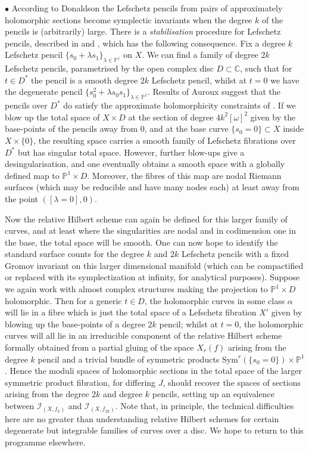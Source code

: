 \documentclass[10pt]{article}
\newcommand{\pp}{\mathbb{P}}
\newcommand{\cc}{\mathbb{C}}
\newcommand{\Sym}{\mathrm{Sym}}
\begin{document}
\noindent $\bullet$  According to Donaldson \cite{Donaldson:pencils} the
Lefschetz pencils from pairs of  approximately holomorphic sections
become symplectic invariants when the degree $k$ of the pencils is
(arbitrarily) large.  There is a
\emph{stabilisation} procedure for Lefschetz pencils, described in
\cite{ivanmodulidivisor} and \cite{AKstabilisation}, which has the
following consequence.  Fix a degree $k$ Lefschetz pencil $\{ s_0 +
\lambda s_1 \}_{\lambda \in \pp^1}$ on $X$.  We can find a family of
degree $2k$ Lefschetz pencils, parametrised by the open complex disc
$D \subset \cc$, such that for $t \in D^*$ the pencil is a smooth
degree $2k$ Lefschetz pencil, whilst at $t = 0$ we have the degenerate
pencil $\{ s_0^2 + \lambda s_0 s_1 \}_{\lambda \in \pp^1}$.  Results 
of Auroux \cite{AurouxGokova} suggest that 
the pencils over $D^*$ do satisfy the
approximate holomorphicity constraints of \cite{Donaldson:pencils}. If we 
blow up the total space of $X \times D$ at the section of degree $4k^2
[\omega]^2$ given by the base-points of the pencils away from $0$, and
at the base curve $\{ s_0 = 0 \} \subset X$ inside $X \times \{ 0 \}$,
the resulting space carries a smooth family of Lefschetz fibrations over
$D^*$ but has singular total space.  However, further blow-ups give a
desingularisation, and one eventually obtains a smooth space with
a globally defined map to $\pp^1 \times D$.
Moreover, the fibres of this map are nodal Riemann surfaces (which may
be reducible and have many nodes each) at least away from the point
$([\lambda=0],0)$.

\vspace{0.2cm}

\noindent Now the relative Hilbert scheme can again be defined for
this larger family of curves, and at least where the singularities are
nodal and in codimension one in the base, the total space will be
smooth.  One can now hope to identify the standard surface counts for
the degree $k$ and $2k$ Lefschetz pencils with a fixed Gromov
invariant on this larger dimensional manifold (which can be
compactified or replaced with its symplectization at infinity, for
analytical purposes).  Suppose we again work with almost complex
structures making the projection to $\pp^1 \times D$ holomorphic.
Then for a generic $t \in
D$, the holomorphic curves in some class $\alpha$ will lie in a fibre
which is just the total space of a Lefschetz fibration $X'$ given by
blowing up the base-points of a degree $2k$ pencil; whilst at $t=0$,
the holomorphic curves will all lie in an irreducible component of the
relative Hilbert scheme formally obtained from a partial gluing of the
space $X_r(f)$ arising from the degree $k$ pencil and a trivial bundle
of symmetric products $\Sym^r(\{ s_0 = 0 \}) \times \pp^1$.  Hence the
moduli spaces of holomorphic sections in the total space of the larger
symmetric product fibration, for differing $J$, should recover the
spaces of sections arising from the degree $2k$ and degree $k$
pencils, setting up an equivalence between $\mathcal{I}_{(X,f_k)}$ and
$\mathcal{I}_{(X, f_{2k})}$.  Note that, in principle, the technical
difficulties here are no greater than understanding relative Hilbert
schemes for certain degenerate but integrable families of curves over
a disc.  We hope to return to this programme elsewhere.
\end{document}
